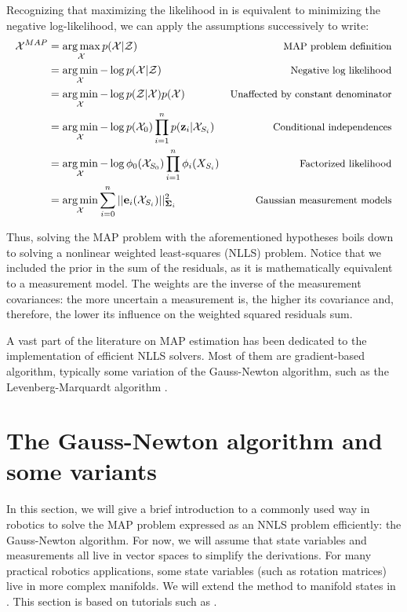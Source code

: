 Recognizing that maximizing the likelihood in  is equivalent to minimizing the negative log-likelihood, we can
apply the assumptions successively to write:
%
\begin{align}
    \mathcal{X}^{MAP} 
    &= \operatorname*{arg\,max}_{\mathcal{X}} p(\mathcal{X} | \mathcal{Z}) &\text{\small MAP problem definition}
    \\
    &= \operatorname*{arg\,min}_{\mathcal{X}} - \log p(\mathcal{X} | \mathcal{Z}) &\text{\small Negative log likelihood}
    \\
    &= \operatorname*{arg\,min}_{\mathcal{X}} - \log p(\mathcal{Z} | \mathcal{X}) p(\mathcal{X}) &\text{\small Unaffected by constant denominator}
    \\
    &= \operatorname*{arg\,min}_{\mathcal{X}} - \log p(\mathcal{X}_0) \prod_{i=1}^{n} p({\bf z}_i | \mathcal{X}_{S_i})  &\text{\small Conditional independences}
    \\
    &= \operatorname*{arg\,min}_{\mathcal{X}} - \log \phi_0(\mathcal{X}_{S_0}) \prod_{i=1}^{n} \phi_i(X_{S_i}) &\text{\small Factorized likelihood}
    \\
    &= \operatorname*{arg\,min}_{\mathcal{X}}  \sum_{i=0}^{n} ||{\bf e}_i(\mathcal{X}_{S_i})||_{{\bm \Sigma}_i}^2  &\text{\small Gaussian measurement models}
\end{align}

Thus, solving the MAP problem with the aforementioned hypotheses boils down to solving a nonlinear weighted least-squares (NLLS) problem.
Notice that we included the prior in the sum of the residuals, as it is mathematically equivalent to a measurement model. 
The weights are the inverse of the measurement covariances: the more uncertain a measurement is, the higher its covariance and, therefore, the lower its influence
on the weighted squared residuals sum. 

A vast part of the literature on MAP estimation has been dedicated to the implementation of efficient \adhoc NLLS solvers. Most of them are 
gradient-based algorithm, typically some variation of the Gauss-Newton algorithm, such as the Levenberg-Marquardt algorithm \cite{boyd2004convex}.





%
%
%
%
%
%
%
\section{The Gauss-Newton algorithm and some variants}
In this section, we will give a brief introduction to a commonly used way in robotics to solve the MAP problem expressed as an NNLS problem efficiently: the Gauss-Newton algorithm.
For now, we will assume that state variables and measurements all live in vector spaces to simplify the derivations. For many practical robotics applications,
some state variables (such as rotation matrices) live in more complex manifolds.
We will extend the method to manifold states in . This section is based on tutorials such as \cite{dellaert2017factor,sola2017course}. 



